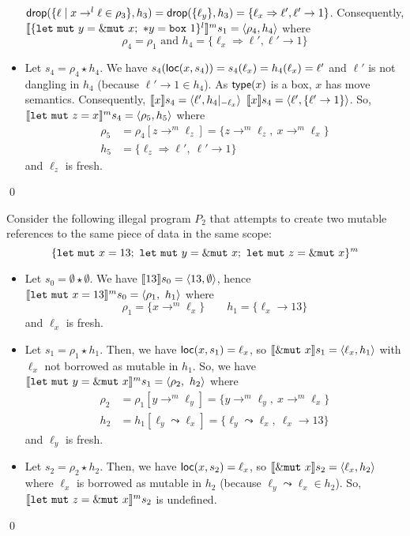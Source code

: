 \begin{example}
\begin{itemize}
    $\drop(\{\ell\mid x\to^l\ell\in\rho_3\},h_3) = \drop(\{\ell_y\},h_3) =
    \{\ell_x\Rightarrow\ell',\ell'\to 1\}$. Consequently,
    $\denl[\{\mathtt{let\ mut}\ y = \mutborrow x;\
    \mathtt{*}y = \mathtt{box}\ 1\}^l]{m}{s_1} =
    \langle \rho_4,h_4\rangle$ where
    \[\rho_4 = \rho_1 \text{ and } h_4 = \{\ell_x\Rightarrow\ell',\ell'\to 1\}\]
    \item Let $s_4 = \rho_4 \star h_4$. We have
    $s_4(\loc(x,s_4)) = s_4(\ell_x) = h_4(\ell_x)=\ell'$ and
    $\ell'$ is not dangling in $h_4$ (because $\ell'\to 1 \in h_4$).
    As $\type(x)$ is a box, $x$ has move semantics. Consequently,
    $\den[x]{s_4} = \langle \ell', {h_4}|_{-\ell_x}\rangle$\ie
    $\den[x]{s_4} = \langle \ell', \{\ell'\to 1\} \rangle$.
    So, $\denl[\mathtt{let\ mut}\ z = x]{m}{s_4} = \langle \rho_5,h_5\rangle$
    where
    \begin{align*}
      \rho_5 & = \rho_4[z\to^m \ell_z] = \{z\to^m \ell_z,\ x\to^m\ell_x\}\\
      h_5 & = \{\ell_z\Rightarrow \ell',\ \ell'\to 1\}
    \end{align*}
    and $\ell_z$ is fresh.
  \end{itemize}
  \qed
\end{example}

\begin{example}
  Consider the following illegal program $P_2$
  that attempts to create two mutable references
  to the same piece of data in the same scope:
  \[
    \{
      \mathtt{let\ mut}\ x = 13;\
      \mathtt{let\ mut}\ y = \mutborrow x;\
      \mathtt{let\ mut}\ z = \mutborrow x
    \}^m
  \]
  \begin{itemize}
    \item Let $s_0=\emptyset \star \emptyset$.
    We have $\den[13]{s_0} = \langle 13,\emptyset\rangle$, hence
    $\denl[\mathtt{let\ mut}\ x = 13]{m}{s_0} =
    \langle \rho_1,\ h_1\rangle$ where
    \[\rho_1=\{x\to^m\ell_x\} \qquad
    h_1 = \{\ell_x\to 13\}\]
    and $\ell_x$ is fresh.
    \item Let $s_1 = \rho_1 \star h_1$.
    Then, we have $\loc(x,s_1) = \ell_x$, so
    $\den[\mutborrow x]{s_1} = \langle \ell_x,h_1\rangle$
    with $\ell_x$ not borrowed as mutable in $h_1$.
    So, we have
    $\denl[\mathtt{let\ mut}\ y = \mutborrow x]{m}{s_1} =
    \langle \rho_2,\ h_2\rangle$
    where
    \begin{align*}
      \rho_2 & = \rho_1[y\to^m\ell_y] = \{y\to^m\ell_y,\ x\to^m\ell_x\}\\
      h_2 & = h_1[\ell_y\leadsto \ell_x] =
      \{\ell_y\leadsto \ell_x,\ \ell_x\to 13\}
    \end{align*}
    and $\ell_y$ is fresh.
    \item Let $s_2 = \rho_2 \star h_2$.
    Then, we have $\loc(x,s_2) = \ell_x$, so
    $\den[\mutborrow x]{s_2} = \langle \ell_x,h_2\rangle$
    where $\ell_x$ is borrowed as mutable in $h_2$
    (because $\ell_y\leadsto \ell_x \in h_2$).
    So, $\denl[\mathtt{let\ mut}\ z = \mutborrow x]{m}{s_2}$
    is undefined.
  \end{itemize}
  \qed
\end{example}

